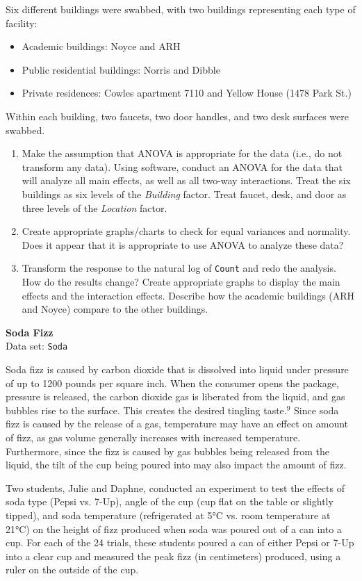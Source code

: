 \documentclass[
]{report}
\begin{document}
\begin{list}{E.}{ \setlength{\itemsep}{1.2em}}
Six different buildings were swabbed, with two buildings representing each type of facility:
\begin{itemize}
    \item Academic buildings: Noyce and ARH
    \item Public residential buildings: Norris and Dibble
    \item Private residences: Cowles apartment 7110 and Yellow House (1478 Park St.)
\end{itemize}
Within each building, two faucets, two door handles, and two desk surfaces were swabbed.

  \begin{enumerate}
    \item Make the assumption that ANOVA is appropriate for the data (i.e., do not transform any data). Using software, conduct an ANOVA for the data that will analyze all main effects, as well as all two-way interactions. Treat the six buildings as six levels of the \textit{Building} factor. Treat faucet, desk, and door as three levels of the \textit{Location} factor.
    \item Create appropriate graphs/charts to check for equal variances and normality. Does it appear that it is appropriate to use ANOVA to analyze these data?
    \item Transform the response to the natural log of \texttt{Count} and redo the analysis. How do the results change? Create appropriate graphs to display the main effects and the interaction effects. Describe how the academic buildings (ARH and Noyce) compare to the other buildings.
  \end{enumerate}

  \item \textbf{Soda Fizz}\\
  Data set: \texttt{Soda}
  
Soda fizz is caused by carbon dioxide that is dissolved into liquid under pressure of up to 1200 pounds per square inch. When the consumer opens the package, pressure is released, the carbon dioxide gas is liberated from the liquid, and gas bubbles rise to the surface. This creates the desired tingling taste.$^9$ Since soda fizz is caused by the release of a gas, temperature may have an effect on amount of fizz, as gas volume generally increases with increased temperature. Furthermore, since the fizz is caused by gas bubbles being released from the liquid, the tilt of the cup being poured into may also impact the amount of fizz.

Two students, Julie and Daphne, conducted an experiment to test the effects of soda type (Pepsi vs. 7-Up), angle of the cup (cup flat on the table or slightly tipped), and soda temperature (refrigerated at 5°C vs. room temperature at 21°C) on the height of fizz produced when soda was poured out of a can into a cup. For each of the 24 trials, these students poured a can of either Pepsi or 7-Up into a clear cup and measured the peak fizz (in centimeters) produced, using a ruler on the outside of the cup.


\end{list}
\end{document}
